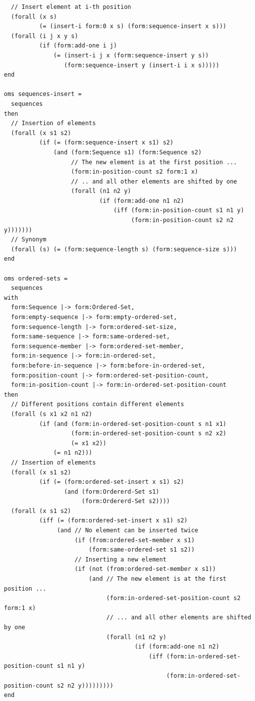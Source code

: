 \documentclass[10pt, a4paper]{isov2}
\begin{document}
\begin{lstlisting}
  // Insert element at i-th position
  (forall (x s)
          (= (insert-i form:0 x s) (form:sequence-insert x s)))
  (forall (i j x y s)
          (if (form:add-one i j)
              (= (insert-i j x (form:sequence-insert y s))
                 (form:sequence-insert y (insert-i i x s)))))
end

oms sequences-insert =
  sequences
then
  // Insertion of elements
  (forall (x s1 s2)
          (if (= (form:sequence-insert x s1) s2)
              (and (form:Sequence s1) (form:Sequence s2)
                   // The new element is at the first position ...
                   (form:in-position-count s2 form:1 x)
                   // .. and all other elements are shifted by one
                   (forall (n1 n2 y)
                           (if (form:add-one n1 n2)
                               (iff (form:in-position-count s1 n1 y)
                                    (form:in-position-count s2 n2 y)))))))
  // Synonym
  (forall (s) (= (form:sequence-length s) (form:sequence-size s)))
end

oms ordered-sets =
  sequences
with
  form:Sequence |-> form:Ordered-Set,
  form:empty-sequence |-> form:empty-ordered-set,
  form:sequence-length |-> form:ordered-set-size,
  form:same-sequence |-> form:same-ordered-set,
  form:sequence-member |-> form:ordered-set-member,
  form:in-sequence |-> form:in-ordered-set,
  form:before-in-sequence |-> form:before-in-ordered-set,
  form:position-count |-> form:ordered-set-position-count,
  form:in-position-count |-> form:in-ordered-set-position-count
then
  // Different positions contain different elements
  (forall (s x1 x2 n1 n2)
          (if (and (form:in-ordered-set-position-count s n1 x1)
                   (form:in-ordered-set-position-count s n2 x2)
                   (= x1 x2))
              (= n1 n2)))
  // Insertion of elements
  (forall (x s1 s2)
          (if (= (form:ordered-set-insert x s1) s2)
                 (and (form:Ordererd-Set s1)
                      (form:Ordererd-Set s2))))
  (forall (x s1 s2)
          (iff (= (form:ordered-set-insert x s1) s2)
               (and // No element can be inserted twice
                    (if (from:ordered-set-member x s1)
                        (form:same-ordered-set s1 s2))
                    // Inserting a new element
                    (if (not (from:ordered-set-member x s1))
                        (and // The new element is at the first position ...
                             (form:in-ordered-set-position-count s2 form:1 x)
                             // ... and all other elements are shifted by one
                             (forall (n1 n2 y)
                                     (if (form:add-one n1 n2)
                                         (iff (form:in-ordered-set-position-count s1 n1 y)
                                              (form:in-ordered-set-position-count s2 n2 y)))))))))
end


\end{lstlisting}
\end{document}
